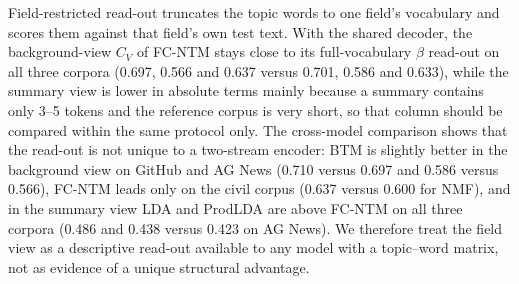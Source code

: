 \documentclass[11pt]{article}
\newcommand{\fcntm}{FC-NTM}
\begin{document}
Field-restricted read-out truncates the topic words to one field's vocabulary and scores them
against that field's own test text. With the shared decoder, the background-view $C_V$ of
\fcntm{} stays close to its full-vocabulary $\beta$ read-out on all three corpora (0.697, 0.566
and 0.637 versus 0.701, 0.586 and 0.633), while the summary view is lower in absolute terms mainly
because a summary contains only 3--5 tokens and the reference corpus is very short, so that column
should be compared within the same protocol only. The cross-model comparison shows that the
read-out is not unique to a two-stream encoder: BTM is slightly better in the background view on
GitHub and AG News (0.710 versus 0.697 and 0.586 versus 0.566), \fcntm{} leads only on the civil
corpus (0.637 versus 0.600 for NMF), and in the summary view LDA and ProdLDA are above \fcntm{}
on all three corpora (0.486 and 0.438 versus 0.423 on AG News). We therefore treat the field view
as a descriptive read-out available to any model with a topic--word matrix, not as evidence of a
unique structural advantage.
\end{document}
